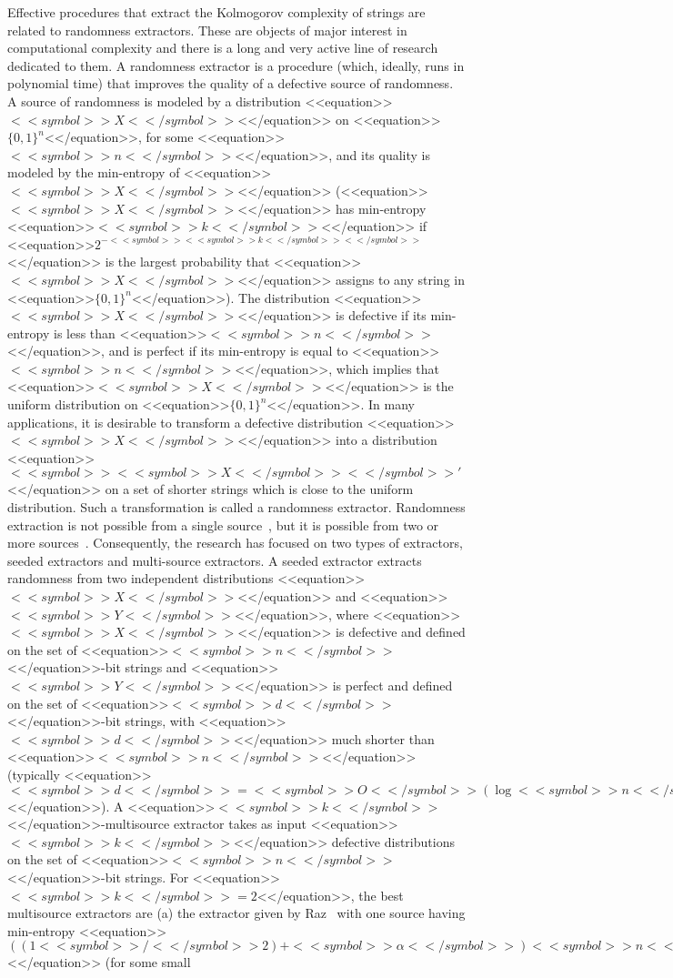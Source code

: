 \documentclass[proceedings]{stacs}
\def\zo{\{0,1\}}
\newcommand{\zon}{\zo^n}
\begin{document}
Effective procedures that extract the Kolmogorov complexity of strings are related to randomness extractors. These are objects of major interest in computational complexity and there is a long and very active line of research dedicated to them. A randomness extractor is a procedure (which, ideally, runs in polynomial time) that improves the quality of a defective source of randomness. A source of randomness is modeled by a distribution <<equation>>$<<symbol>>X<</symbol>>$<</equation>> on <<equation>>$\zon$<</equation>>, for some <<equation>>$<<symbol>>n<</symbol>>$<</equation>>, and its quality is modeled by the min-entropy of <<equation>>$<<symbol>>X<</symbol>>$<</equation>> (<<equation>>$<<symbol>>X<</symbol>>$<</equation>> has min-entropy <<equation>>$<<symbol>>k<</symbol>>$<</equation>> if <<equation>>$2^{-<<symbol>><<symbol>>k<</symbol>><</symbol>>}$<</equation>> is the largest probability that <<equation>>$<<symbol>>X<</symbol>>$<</equation>> assigns to any string in <<equation>>$\zon$<</equation>>). The distribution <<equation>>$<<symbol>>X<</symbol>>$<</equation>> is defective if its min-entropy is less than <<equation>>$<<symbol>>n<</symbol>>$<</equation>>, and is perfect if its min-entropy is equal to <<equation>>$<<symbol>>n<</symbol>>$<</equation>>, which implies that <<equation>>$<<symbol>>X<</symbol>>$<</equation>> is the uniform distribution on <<equation>>$\zon$<</equation>>. In many applications, it is desirable to transform a defective distribution <<equation>>$<<symbol>>X<</symbol>>$<</equation>> into a distribution <<equation>>$<<symbol>><<symbol>>X<</symbol>><</symbol>>'$<</equation>> on a set of shorter strings which is close to the uniform distribution. Such a transformation is called a randomness extractor. Randomness extraction is not possible from a single source~\cite{san-vaz:j:quasirand}, but it is possible from two or more sources~\cite{vaz:j:sources}. Consequently, the research has focused on two types of extractors, seeded extractors and multi-source extractors. A seeded extractor extracts randomness from two independent distributions <<equation>>$<<symbol>>X<</symbol>>$<</equation>> and <<equation>>$<<symbol>>Y<</symbol>>$<</equation>>, where <<equation>>$<<symbol>>X<</symbol>>$<</equation>> is defective and defined on the set of <<equation>>$<<symbol>>n<</symbol>>$<</equation>>-bit strings  and <<equation>>$<<symbol>>Y<</symbol>>$<</equation>> is perfect and defined on the set of <<equation>>$<<symbol>>d<</symbol>>$<</equation>>-bit strings, with <<equation>>$<<symbol>>d<</symbol>>$<</equation>> much shorter than <<equation>>$<<symbol>>n<</symbol>>$<</equation>> (typically <<equation>>$<<symbol>>d<</symbol>> = <<symbol>>O<</symbol>>(\log <<symbol>>n<</symbol>>)$<</equation>>). A <<equation>>$<<symbol>>k<</symbol>>$<</equation>>-multisource extractor takes as input <<equation>>$<<symbol>>k<</symbol>>$<</equation>> defective distributions on the set of <<equation>>$<<symbol>>n<</symbol>>$<</equation>>-bit strings. For <<equation>>$<<symbol>>k<</symbol>>=2$<</equation>>, the best  multisource extractors  are (a) the extractor given by Raz~\cite{raz:c:multiextract} with one source having min-entropy <<equation>>$((1<<symbol>>/<</symbol>>2) + <<symbol>>\alpha<</symbol>>)<<symbol>>n<</symbol>>$<</equation>> (for some small 
\end{document}
